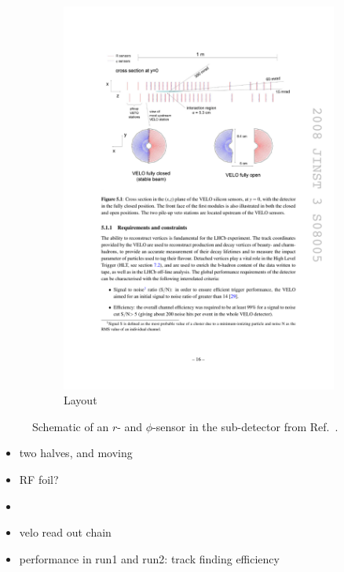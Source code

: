 \begin{figure}[!h]
\begin{subfigure}[t]{0.8\textwidth}
        \includegraphics[width=1.0\textwidth]{figs/Detector/velo_sensor_layout.pdf}
        \caption{Layout}
    \end{subfigure}
    \caption{Schematic of an $r$- and $\phi$-sensor in the \velo sub-detector from Ref.~\cite{LHCb-DP-2014-001}.}

    \label{fig:Dec_velo_sensor_Schematic}   
\end{figure}


{\color{Red}
\begin{itemize}
\item two halves, and moving
\item RF foil?
\item 
\item velo read out chain
\item performance in run1 and run2: track finding efficiency 
\end{itemize}
}




